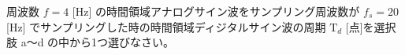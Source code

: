 周波数 $f = 4$ [Hz] の時間領域アナログサイン波をサンプリング周波数が $f_s = 20$ [Hz] でサンプリングした時の時間領域ディジタルサイン波の周期 $\textrm{T}_d$ [点]を選択肢 a〜d の中から1つ選びなさい。
